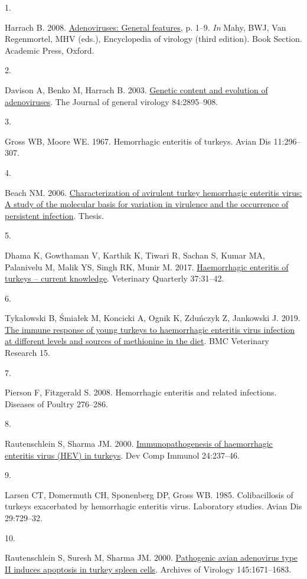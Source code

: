 \documentclass[
]{article}
\newlength{\cslhangindent}
\newlength{\csllabelwidth}
\newenvironment{CSLReferences}[2] %
 {\begin{list}{}{%
  \setlength{\itemindent}{0pt}
  \setlength{\leftmargin}{0pt}
  \setlength{\parsep}{0pt}
  \ifodd #1
   \setlength{\leftmargin}{\cslhangindent}
   \setlength{\itemindent}{-1\cslhangindent}
  \fi
  \setlength{\itemsep}{#2\baselineskip}}}
 {\end{list}}
\newcommand{\CSLLeftMargin}[1]{\parbox[t]{\csllabelwidth}{\strut#1\strut}}
\newcommand{\CSLRightInline}[1]{\parbox[t]{\linewidth - \csllabelwidth}{\strut#1\strut}}
\begin{document}
\label{refs}
\begin{CSLReferences}{0}{1}
\CSLLeftMargin{1. }%
\CSLRightInline{Harrach B. 2008.
\href{https://doi.org/10.1016/B978-012374410-4.00680-4}{Adenoviruses:
General features}, p. 1--9. \emph{In} Mahy, BWJ, Van Regenmortel, MHV
(eds.), Encyclopedia of virology (third edition). Book Section. Academic
Press, Oxford.}

\CSLLeftMargin{2. }%
\CSLRightInline{Davison A, Benko M, Harrach B. 2003.
\href{https://doi.org/10.1099/vir.0.19497-0}{Genetic content and
evolution of adenoviruses}. The Journal of general virology
84:2895--908.}

\CSLLeftMargin{3. }%
\CSLRightInline{Gross WB, Moore WE. 1967. Hemorrhagic enteritis of
turkeys. Avian Dis 11:296--307.}

\CSLLeftMargin{4. }%
\CSLRightInline{Beach NM. 2006.
\href{http://scholar.lib.vt.edu/theses/available/etd-08142006-145339/}{Characterization
of avirulent turkey hemorrhagic enteritis virus: A study of the
molecular basis for variation in virulence and the occurrence of
persistent infection}. Thesis.}

\CSLLeftMargin{5. }%
\CSLRightInline{Dhama K, Gowthaman V, Karthik K, Tiwari R, Sachan S,
Kumar MA, Palanivelu M, Malik YS, Singh RK, Munir M. 2017.
\href{https://doi.org/10.1080/01652176.2016.1277281}{Haemorrhagic
enteritis of turkeys -- current knowledge}. Veterinary Quarterly
37:31--42.}

\CSLLeftMargin{6. }%
\CSLRightInline{Tykałowski B, Śmiałek M, Koncicki A, Ognik K, Zduńczyk
Z, Jankowski J. 2019.
\href{https://doi.org/10.1186/s12917-019-2138-8}{The immune response of
young turkeys to haemorrhagic enteritis virus infection at different
levels and sources of methionine in the diet}. BMC Veterinary Research
15.}

\CSLLeftMargin{7. }%
\CSLRightInline{Pierson F, Fitzgerald S. 2008. Hemorrhagic enteritis and
related infections. Diseases of Poultry 276--286.}

\CSLLeftMargin{8. }%
\CSLRightInline{Rautenschlein S, Sharma JM. 2000.
\href{https://doi.org/10.1016/s0145-305x(99)00075-0}{Immunopathogenesis
of haemorrhagic enteritis virus (HEV) in turkeys}. Dev Comp Immunol
24:237--46.}

\CSLLeftMargin{9. }%
\CSLRightInline{Larsen CT, Domermuth CH, Sponenberg DP, Gross WB. 1985.
Colibacillosis of turkeys exacerbated by hemorrhagic enteritis virus.
Laboratory studies. Avian Dis 29:729--32.}

\CSLLeftMargin{10. }%
\CSLRightInline{Rautenschlein S, Suresh M, Sharma JM. 2000.
\href{https://doi.org/10.1007/s007050070083}{Pathogenic avian adenovirus
type II induces apoptosis in turkey spleen cells}. Archives of Virology
145:1671--1683.}

\end{CSLReferences}
\end{document}
